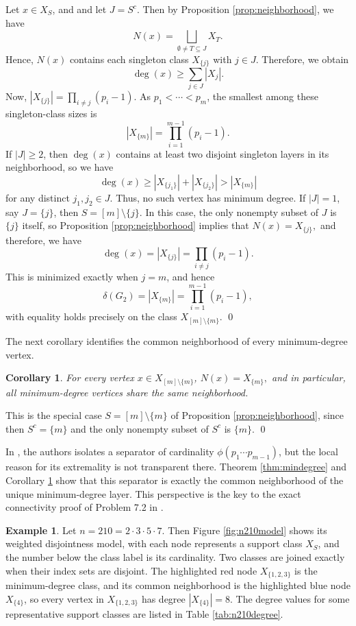 \documentclass[12pt]{article}
\renewenvironment{proof}{{\bf \noindent Proof.}}{\qed}
\newtheorem{corollary}[theorem]{Corollary}
\theoremstyle{definition}
\newtheorem{example}[theorem]{Example}
\begin{document}
	\begin{proof}
		Let $x\in X_S$, and and let $J=S^c$. Then by Proposition \ref{prop:neighborhood}, we have
		$$
		N(x)=\bigsqcup_{\emptyset\neq T\subseteq J}X_T.
		$$
		Hence, $N(x)$ contains each singleton class $X_{\{j\}}$ with $j\in J$. Therefore, we obtain
		$$
		\deg(x)\geq \sum_{j\in J}|X_{{j}}|.
		$$
		Now, $ |X_{\{j\}}|=\prod_{i\neq j}(p_i-1). $ As $p_1<\cdots<p_m$, the smallest among these singleton-class sizes is
		$$
		|X_{\{m\}}|=\prod_{i=1}^{m-1}(p_i-1).
		$$
		 If $|J|\geq 2$, then $\deg(x)$ contains at least two disjoint singleton layers in its neighborhood, so we have
		$$
		\deg(x)\geq |X_{\{j_1\}}|+|X_{\{j_2\}}|>|X_{\{m\}}|
		$$
		for any distinct $j_1,j_2\in J$. Thus,  no such vertex has minimum degree. If $|J|=1$, say $J=\{j\}$, then $S=[m]\setminus\{j\}$. In this case, the only nonempty subset of $J$ is $\{j\}$ itself, so Proposition \ref{prop:neighborhood} implies that $N(x)=X_{\{j\}},$ 	and therefore, we have
		$$
		\deg(x)=|X_{\{j\}}|=\prod_{i\neq j}(p_i-1).
		$$
		This is minimized exactly when $j=m$, and hence
		$$
		\delta(G_2)=|X_{\{m\}}|=\prod_{i=1}^{m-1}(p_i-1),
		$$
		with equality holds precisely on the class $X_{[m]\setminus\{m\}}$.
	\end{proof}
	
	\medskip
	 The next corollary identifies the common neighborhood of every minimum-degree vertex.
	\begin{corollary}\label{cor:minlayerneighborhood}
		For every vertex $x\in X_{[m]\setminus\{m\}}$,
		$ N(x)=X_{\{m\}},$ and in particular, all minimum-degree vertices share the same neighborhood.
	\end{corollary}
	
	\begin{proof}
		This is the special case $S=[m]\setminus\{m\}$ of Proposition \ref{prop:neighborhood}, since then $S^c=\{m\}$ and the only nonempty subset of $S^c$ is $\{m\}$.
	\end{proof}
	
	 In \cite{Banerjee2022,afkhami}, the authors isolates a separator of cardinality $\phi(p_1\cdots p_{m-1})$, but the local reason for its extremality is not transparent there. Theorem \ref{thm:mindegree} and Corollary \ref{cor:minlayerneighborhood} show that this separator is exactly the common neighborhood of the unique minimum-degree layer. This perspective is the key to the exact connectivity proof of Problem 7.2 in \cite{Banerjee2022}.
	
	\begin{example}\label{ex:n210degree}
		Let $n=210=2\cdot 3\cdot 5\cdot 7$. Then Figure \ref{fig:n210model} shows its weighted disjointness model, with each node represents a support class $X_S$, and the number below the class label is its cardinality. Two classes are joined exactly when their index sets are disjoint. The highlighted red node $X_{\{1,2,3\}}$ is the minimum-degree class, and its common neighborhood is the highlighted blue node $X_{\{4\}}$, so every vertex in $X_{\{1,2,3\}}$ has degree $|X_{\{4\}}|=8$.	The degree values for some representative support classes are listed in Table \ref{tab:n210degree}.
	\end{example}
	
\end{document}

